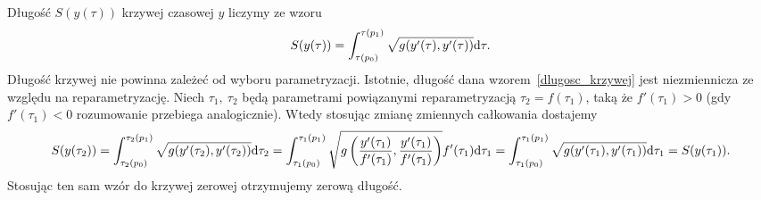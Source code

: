 Długość $S(y(\tau))$ krzywej czasowej $y$ liczymy 
ze wzoru
\begin{align}\label{dlugosc_krzywej}
S( y(\tau) ) = \int_{\tau(p_0)}^{\tau(p_1)} \sqrt{g (
y' (\tau), y' (\tau) )} \text{d} \tau.
\end{align}
Długość krzywej nie powinna zależeć od wyboru parametryzacji.
Istotnie, długość dana wzorem~\eqref{dlugosc_krzywej}
jest niezmiennicza ze względu na reparametryzację.
Niech $\tau_1,\ \tau_2$ będą parametrami powiązanymi 
reparametryzacją $\tau_2 = f(\tau_1)$, taką że 
$f'(\tau_1) > 0$ (gdy $f'(\tau_1) <0$ rozumowanie 
przebiega analogicznie).
Wtedy stosując zmianę zmiennych całkowania dostajemy
\begin{align}
S(y(\tau_2)) = 
\int_{\tau_2(p_0)}^{\tau_2(p_1)} \sqrt{g (
y' (\tau_2), y' (\tau_2) )} \text{d} \tau_2  = 
\int_{\tau_1(p_0)}^{\tau_1(p_1)} \sqrt{g \left(
\frac{ y' (\tau_1) }{ f'(\tau_1)}, 
\frac{ y' (\tau_1) }{ f'(\tau_1)} \right)} 
f'(\tau_1) \text{d} \tau_1  = 
\int_{\tau_1(p_0)}^{\tau_1(p_1)} \sqrt{g (
y' (\tau_1), y' (\tau_1)  )} \text{d} \tau_1  
=S(y(\tau_1)).
\end{align}
Stosując ten sam wzór do krzywej zerowej otrzymujemy zerową
długość.

